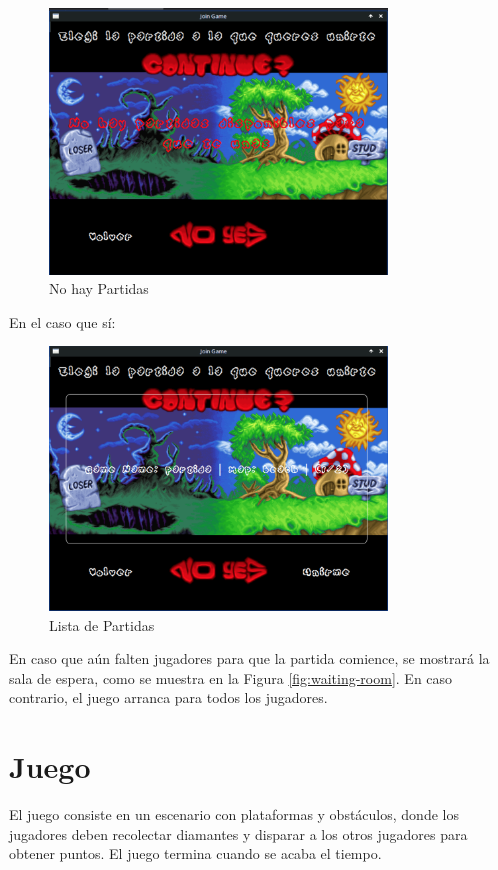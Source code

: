 \documentclass[titlepage,a4paper]{article}
\begin{document}
\begin{figure}[H]
  \centering
  \includegraphics[width=0.8\textwidth]{images/Lobby/GamesListNoGames.png}
  \caption{No hay Partidas}
  \label{fig:no-games}
\end{figure}

En el caso que sí:

\begin{figure}[H]
  \centering
  \includegraphics[width=0.8\textwidth]{images/Lobby/GamesList.png}
  \caption{Lista de Partidas}
  \label{fig:games-list}
\end{figure}

En caso que aún falten jugadores para que la partida comience, se mostrará la sala de espera, como se muestra en la Figura \ref{fig:waiting-room}. En caso contrario, el juego arranca para todos los jugadores.


\section{Juego} 
El juego consiste en un escenario con plataformas y obstáculos, donde los jugadores deben recolectar diamantes y disparar a los otros jugadores para obtener puntos. El juego termina cuando se acaba el tiempo.
\end{document}
